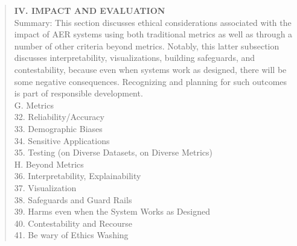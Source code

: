 \documentclass{clv3}
\begin{document}
\begin{quote}
\noindent \textbf{IV. IMPACT AND EVALUATION}\\[5pt]
Summary: This section discusses ethical considerations associated with the impact of AER systems using both traditional metrics as well as through a number of other criteria beyond metrics. Notably, this latter subsection discusses interpretability, visualizations, building safeguards, and contestability, because even when systems work as designed, there will be some negative consequences. Recognizing and planning for such outcomes is part of responsible development.\\[5pt]
G. Metrics\\[3pt]
\hspace*{3mm}  32. Reliability/Accuracy\\
\hspace*{3mm}  33. Demographic Biases\\
\hspace*{3mm}  34. Sensitive Applications\\
\hspace*{3mm}  35. Testing (on Diverse Datasets, on Diverse Metrics)\\[5pt]
H. Beyond Metrics\\[3pt]
\hspace*{3mm}  36. Interpretability, Explainability\\
\hspace*{3mm}  37. Visualization\\
\hspace*{3mm}  38. Safeguards and Guard Rails\\
\hspace*{3mm}  39. Harms even when the System Works as Designed\\
\hspace*{3mm}  40. Contestability and Recourse\\
\hspace*{3mm}  41. Be wary of Ethics Washing\\[3pt]


\end{quote}
\end{document}
